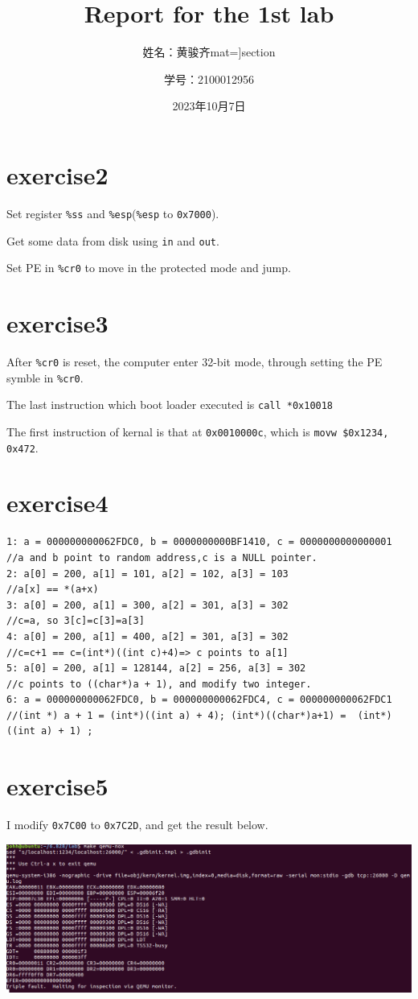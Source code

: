\documentclass[UTF8,11pt]{ctexart}
\title{Report for the 1st lab}
\author{姓名：黄骏齐mat={\Large\bfseries}]{section}
\and 学号：2100012956}
\date{2023年10月7日}
\begin{document}
\maketitle
\section*{exercise2}
    Set register \verb|%ss| and \verb|%esp|(\verb|%esp| to \verb|0x7000|).

    Get some data from disk using \verb|in| and \verb|out|.

    Set PE in \verb|%cr0| to move in the protected mode and jump.
\section*{exercise3}

After \verb|%cr0| is reset, the computer enter 32-bit mode, through setting the PE symble in \verb|%cr0|.

The last instruction which boot loader executed is \verb|call *0x10018|

The first instruction of kernal is that at \verb|0x0010000c|, which is \verb|movw $0x1234, 0x472|.
\section*{exercise4}
\begin{lstlisting}
1: a = 000000000062FDC0, b = 0000000000BF1410, c = 0000000000000001
//a and b point to random address,c is a NULL pointer.
2: a[0] = 200, a[1] = 101, a[2] = 102, a[3] = 103
//a[x] == *(a+x)
3: a[0] = 200, a[1] = 300, a[2] = 301, a[3] = 302
//c=a, so 3[c]=c[3]=a[3]
4: a[0] = 200, a[1] = 400, a[2] = 301, a[3] = 302
//c=c+1 == c=(int*)((int c)+4)=> c points to a[1]
5: a[0] = 200, a[1] = 128144, a[2] = 256, a[3] = 302
//c points to ((char*)a + 1), and modify two integer.
6: a = 000000000062FDC0, b = 000000000062FDC4, c = 000000000062FDC1
//(int *) a + 1 = (int*)((int a) + 4); (int*)((char*)a+1) =  (int*)((int a) + 1) ;
\end{lstlisting}
\newpage
\section*{exercise5}

I modify \verb|0x7C00| to \verb|0x7C2D|, and get the result below.

\includegraphics*[scale=0.65]{ex5.png}
\end{document}
